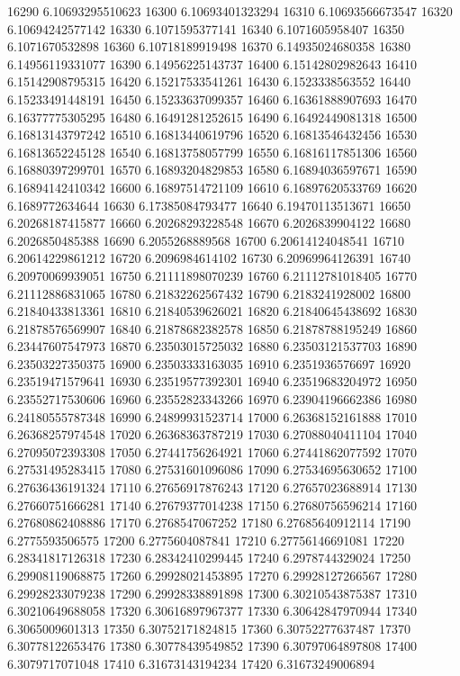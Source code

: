 {16290 6.10693295510623
16300 6.10693401323294
16310 6.10693566673547
16320 6.10694242577142
16330 6.1071595377141
16340 6.1071605958407
16350 6.1071670532898
16360 6.10718189919498
16370 6.14935024680358
16380 6.14956119331077
16390 6.14956225143737
16400 6.15142802982643
16410 6.15142908795315
16420 6.15217533541261
16430 6.1523338563552
16440 6.15233491448191
16450 6.15233637099357
16460 6.16361888907693
16470 6.16377775305295
16480 6.16491281252615
16490 6.16492449081318
16500 6.16813143797242
16510 6.16813440619796
16520 6.16813546432456
16530 6.16813652245128
16540 6.16813758057799
16550 6.16816117851306
16560 6.16880397299701
16570 6.16893204829853
16580 6.16894036597671
16590 6.16894142410342
16600 6.16897514721109
16610 6.16897620533769
16620 6.1689772634644
16630 6.17385084793477
16640 6.19470113513671
16650 6.20268187415877
16660 6.20268293228548
16670 6.2026839904122
16680 6.2026850485388
16690 6.2055268889568
16700 6.20614124048541
16710 6.20614229861212
16720 6.2096984614102
16730 6.20969964126391
16740 6.20970069939051
16750 6.21111898070239
16760 6.21112781018405
16770 6.21112886831065
16780 6.21832262567432
16790 6.2183241928002
16800 6.21840433813361
16810 6.21840539626021
16820 6.21840645438692
16830 6.21878576569907
16840 6.21878682382578
16850 6.21878788195249
16860 6.23447607547973
16870 6.23503015725032
16880 6.23503121537703
16890 6.23503227350375
16900 6.23503333163035
16910 6.2351936576697
16920 6.23519471579641
16930 6.23519577392301
16940 6.23519683204972
16950 6.23552717530606
16960 6.23552823343266
16970 6.23904196662386
16980 6.24180555787348
16990 6.24899931523714
17000 6.26368152161888
17010 6.26368257974548
17020 6.26368363787219
17030 6.27088040411104
17040 6.27095072393308
17050 6.27441756264921
17060 6.27441862077592
17070 6.27531495283415
17080 6.27531601096086
17090 6.27534695630652
17100 6.27636436191324
17110 6.27656917876243
17120 6.27657023688914
17130 6.27660751666281
17140 6.27679377014238
17150 6.27680756596214
17160 6.27680862408886
17170 6.2768547067252
17180 6.27685640912114
17190 6.2775593506575
17200 6.2775604087841
17210 6.27756146691081
17220 6.28341817126318
17230 6.28342410299445
17240 6.2978744329024
17250 6.29908119068875
17260 6.29928021453895
17270 6.29928127266567
17280 6.29928233079238
17290 6.29928338891898
17300 6.30210543875387
17310 6.30210649688058
17320 6.30616897967377
17330 6.30642847970944
17340 6.3065009601313
17350 6.30752171824815
17360 6.30752277637487
17370 6.30778122653476
17380 6.30778439549852
17390 6.30797064897808
17400 6.3079717071048
17410 6.31673143194234
17420 6.31673249006894
}
